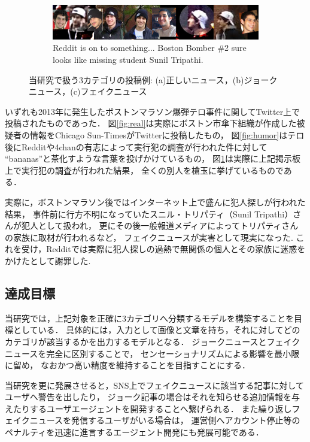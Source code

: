 \begin{figure}[ht]
\begin{subfigure}[b]{\textwidth}
        \includegraphics[width=\textwidth]{images/fake_example_boston.jpg}
        \caption{Reddit is on to something... Boston Bomber \#2 sure looks like missing student Sunil Tripathi. }
        \label{fig:fake}
    \end{subfigure}
    \caption{当研究で扱う3カテゴリの投稿例: (a)正しいニュース，(b)ジョークニュース，(c)フェイクニュース}
    \label{fig:examples}
\end{figure}

いずれも2013年に発生したボストンマラソン爆弾テロ事件に関してTwitter上で投稿されたものであった．
図\ref{fig:real}は実際にボストン市傘下組織が作成した被疑者の情報をChicago Sun-TimesがTwitterに投稿したもの，
図\ref{fig:humor}はテロ後にRedditや4chanの有志によって実行犯の調査が行われた件に対して
``bananas''と茶化すような言葉を投げかけているもの，
図\ref{fig:fake}は実際に上記掲示板上で実行犯の調査が行われた結果，
全くの別人を槍玉に挙げているものである．

実際に，ボストンマラソン後ではインターネット上で盛んに犯人探しが行われた結果，
事件前に行方不明になっていたスニル・トリパティ（Sunil Tripathi）さんが犯人として扱われ，
更にその後一般報道メディアによってトリパティさんの家族に取材が行われるなど，
フェイクニュースが実害として現実になった\cite{gray_2013}.
これを受け，Redditでは実際に犯人探しの過熱で無関係の個人とその家族に迷惑をかけたとして謝罪した\cite{laird_2013}.

%
\subsection{達成目標}
当研究では，上記対象を正確に3カテゴリへ分類するモデルを構築することを目標としている．
具体的には，入力として画像と文章を持ち，それに対してどのカテゴリが該当するかを出力するモデルとなる．
ジョークニュースとフェイクニュースを完全に区別することで，
センセーショナリズムによる影響を最小限に留め，
なおかつ高い精度を維持することを目指すことにする．

当研究を更に発展させると，SNS上でフェイクニュースに該当する記事に対してユーザへ警告を出したり，
ジョーク記事の場合はそれを知らせる追加情報を与えたりするユーザエージェントを開発することへ繋げられる．
また繰り返しフェイクニュースを発信するユーザがいる場合は，
運営側へアカウント停止等のペナルティを迅速に進言するエージェント開発にも発展可能である．

%